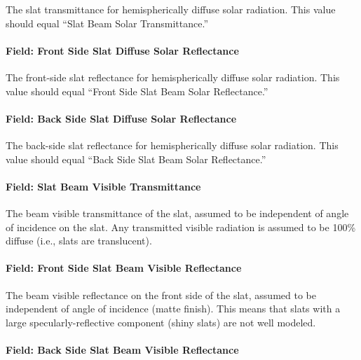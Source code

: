 The slat transmittance for hemispherically diffuse solar radiation. This value should equal ``Slat Beam Solar Transmittance.''

\paragraph{Field: Front Side Slat Diffuse Solar Reflectance}\label{field-front-side-slat-diffuse-solar-reflectance}

The front-side slat reflectance for hemispherically diffuse solar radiation. This value should equal ``Front Side Slat Beam Solar Reflectance.''

\paragraph{Field: Back Side Slat Diffuse Solar Reflectance}\label{field-back-side-slat-diffuse-solar-reflectance}

The back-side slat reflectance for hemispherically diffuse solar radiation. This value should equal ``Back Side Slat Beam Solar Reflectance.''

\paragraph{Field: Slat Beam Visible Transmittance}\label{field-slat-beam-visible-transmittance}

The beam visible transmittance of the slat, assumed to be independent of angle of incidence on the slat. Any transmitted visible radiation is assumed to be 100\% diffuse (i.e., slats are translucent).

\paragraph{Field: Front Side Slat Beam Visible Reflectance}\label{field-front-side-slat-beam-visible-reflectance}

The beam visible reflectance on the front side of the slat, assumed to be independent of angle of incidence (matte finish). This means that slats with a large specularly-reflective component (shiny slats) are not well modeled.

\paragraph{Field: Back Side Slat Beam Visible Reflectance}\label{field-back-side-slat-beam-visible-reflectance}


